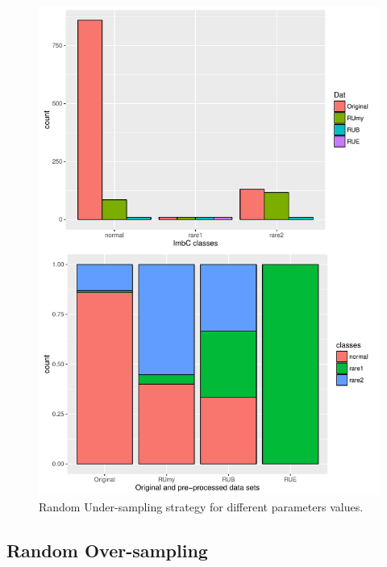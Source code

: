 \documentclass[10pt,a4paper]{article}\usepackage[]{graphicx}\usepackage[]{color}
\makeatletter
\def\maxwidth{ %
  \ifdim\Gin@nat@width>\linewidth
    \linewidth
  \else
    \Gin@nat@width
  \fi
}
\newenvironment{knitrout}{}{} %
\makeatother
\begin{document}
\begin{knitrout}\footnotesize
{}\color{fgcolor}\begin{figure}

{\centering \includegraphics[width=\maxwidth]{figures/UBL-Iris_RU2-1} 

}

\caption[Random Under-sampling strategy for different parameters values]{Random Under-sampling strategy for different parameters values.}\label{fig:Iris_RU2}
\end{figure}


\end{knitrout}



\subsection{Random Over-sampling}\label{sec:ROClassif}
\end{document}
